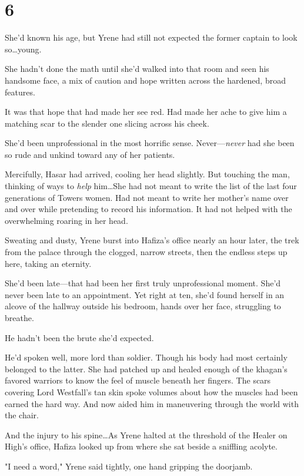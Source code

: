 
\chapter{6}

She'd known his age, but Yrene had still not expected the former captain to look so\ldots young.

She hadn't done the math until she'd walked into that room and seen his handsome face, a mix of caution and hope written across the hardened, broad features.

It was that hope that had made her see red.
Had made her ache to give him a matching scar to the slender one slicing across his cheek.

She'd been unprofessional in the most horrific sense.
Never---\emph{never} had she been so rude and unkind toward any of her patients.

Mercifully, Hasar had arrived, cooling her head slightly.
But touching the man, thinking of ways to \emph{help} him\ldots She had not meant to write the list of the last four generations of Towers women.
Had not meant to write her mother's name over and over while pretending to record his information.
It had not helped with the overwhelming roaring in her head.

Sweating and dusty, Yrene burst into Hafiza's office nearly an hour later, the trek from the palace through the clogged, narrow streets, then the endless steps up here, taking an eternity.

She'd been late---that had been her first truly unprofessional moment.
She'd never been late to an appointment.
Yet right at ten, she'd found herself in an alcove of the hallway outside his bedroom, hands over her face, struggling to breathe.

He hadn't been the brute she'd expected.

He'd spoken well, more lord than soldier.
Though his body had most certainly belonged to the latter.
She had patched up and healed enough of the khagan's favored warriors to know the feel of muscle beneath her fingers.
The scars covering Lord Westfall's tan skin spoke volumes about how the muscles had been earned the hard way.
And now aided him in maneuvering through the world with the chair.

And the injury to his spine\ldots As Yrene halted at the threshold of the Healer on High's office, Hafiza looked up from where she sat beside a sniffling acolyte.

"I need a word," Yrene said tightly, one hand gripping the doorjamb.


